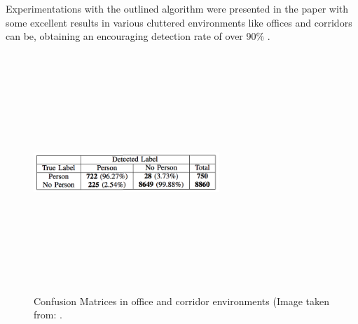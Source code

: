 Experimentations with the outlined algorithm were presented in the paper with some excellent results in various cluttered environments like offices and corridors can be, obtaining an encouraging detection rate of over 90\% \cite{arras2007using}.

\begin{figure}[!htbp]
\begin{center}
\includegraphics[width=7cm,height=9cm,keepaspectratio]{images/leg_cfm.png}
\end{center}
\caption{Confusion Matrices in office and corridor environments (Image taken from: \cite{arras2007using}.}
\end{figure}




